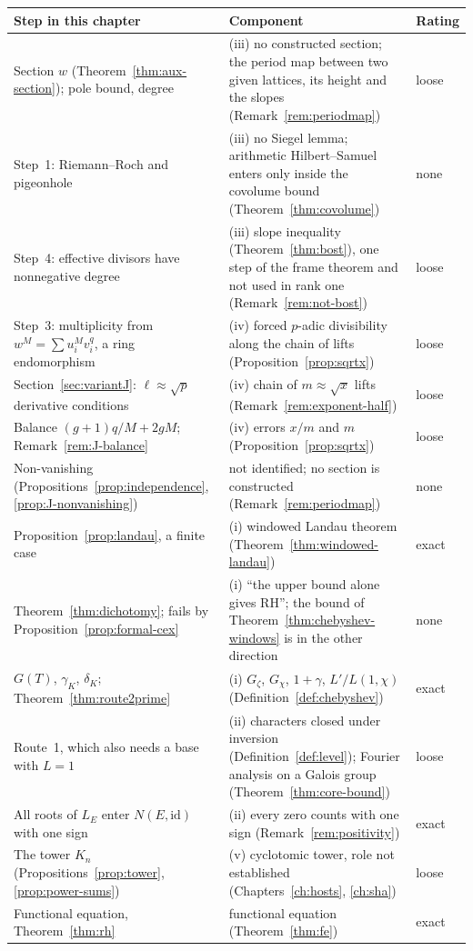 \documentclass[11pt]{amsbook}
\theoremstyle{plain}
\theoremstyle{definition}
\theoremstyle{remark}
\numberwithin{equation}{section}
\numberwithin{figure}{chapter}
\numberwithin{table}{chapter}
\newcommand{\Gz}{G_{\zeta}}
\begin{document}
{\footnotesize
\begin{longtable}{>{\raggedright}p{}
>{\raggedright}p{}l}
\toprule
Step in this chapter & Component & Rating\\
\midrule
\endhead
Section $w$ (Theorem~\ref{thm:aux-section}); pole bound, degree
& (iii) no constructed section; the period map between two given
lattices, its height and the slopes (Remark~\ref{rem:periodmap})
& loose\\
Step~1: Riemann--Roch and pigeonhole
& (iii) no Siegel lemma; arithmetic Hilbert--Samuel enters only
inside the covolume bound (Theorem~\ref{thm:covolume}) & none\\
Step~4: effective divisors have nonnegative degree
& (iii) slope inequality (Theorem~\ref{thm:bost}), one step of
the frame theorem and not used in rank one
(Remark~\ref{rem:not-bost}) & loose\\
Step~3: multiplicity from $w^M=\sum u_i^Mv_i^q$, a ring
endomorphism
& (iv) forced $p$-adic divisibility along the chain of lifts
(Proposition~\ref{prop:sqrtx}) & loose\\
Section~\ref{sec:variantJ}: $\ell\approx\sqrt p$ derivative
conditions
& (iv) chain of $m\approx\sqrt x$ lifts
(Remark~\ref{rem:exponent-half}) & loose\\
Balance $(g+1)q/M+2gM$; Remark~\ref{rem:J-balance}
& (iv) errors $x/m$ and $m$ (Proposition~\ref{prop:sqrtx})
& loose\\
Non-vanishing (Propositions~\ref{prop:independence},
\ref{prop:J-nonvanishing}) & not identified; no section is
constructed (Remark~\ref{rem:periodmap}) & none\\
Proposition~\ref{prop:landau}, a finite case & (i) windowed Landau
theorem (Theorem~\ref{thm:windowed-landau}) & exact\\
Theorem~\ref{thm:dichotomy}; fails by
Proposition~\ref{prop:formal-cex}
& (i) ``the upper bound alone gives RH''; the bound of
Theorem~\ref{thm:chebyshev-windows} is in the other direction
& none\\
$G(T)$, $\gamma_K$, $\delta_K$; Theorem~\ref{thm:route2prime}
& (i) $\Gz$, $G_\chi$, $1+\gamma$, $L'/L(1,\chi)$
(Definition~\ref{def:chebyshev}) & exact\\
Route~1, which also needs a base with $L=1$
& (ii) characters closed under inversion
(Definition~\ref{def:level}); Fourier analysis on a Galois group
(Theorem~\ref{thm:core-bound}) & loose\\
All roots of $L_E$ enter $N(E,\mathrm{id})$ with one sign
& (ii) every zero counts with one sign
(Remark~\ref{rem:positivity}) & exact\\
The tower $K_n$ (Propositions~\ref{prop:tower},
\ref{prop:power-sums}) & (v) cyclotomic tower, role not established
(Chapters~\ref{ch:hosts}, \ref{ch:sha}) & loose\\
Functional equation, Theorem~\ref{thm:rh} & functional equation
(Theorem~\ref{thm:fe}) & exact\\
\bottomrule
\end{longtable}
}
\end{document}
